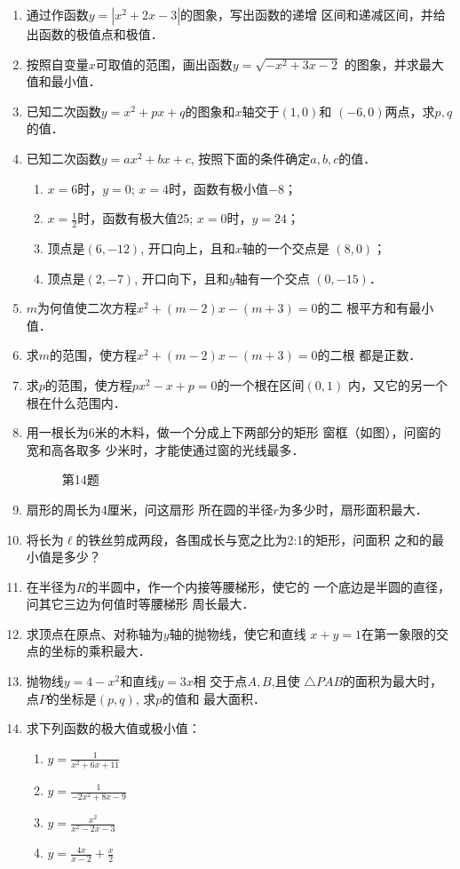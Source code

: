 \begin{enumerate}
\item 通过作函数$y=|x^2+2x-3|$的图象，写出函数的递增
区间和递减区间，并给出函数的极值点和极值．
\item 按照自变量$x$可取值的范围，画出函数$y=\sqrt{-x^2+3x-2}$
的图象，并求最大值和最小值．
\item 已知二次函数$y=x^2+px+q$的图象和$x$轴交于$(1,0)$和
$(-6,0)$两点，求$p,q$的值．
\item 已知二次函数$y=ax^2+bx+c$, 按照下面的条件确定$a,
b,c$的值．
\begin{enumerate}
\item $x=6$时，$y=0$; $x=4$时，函数有极小值$-8$；
\item $x=\frac{1}{2}$时，函数有极大值25; $x=0$时，$y=24$；
\item 顶点是$(6,-12)$, 开口向上，且和$x$轴的一个交点是
$(8,0)$；
\item 顶点是$(2,-7)$, 开口向下，且和$y$轴有一个交点
$(0,-15)$．
\end{enumerate}

\item  $m$为何值使二次方程$x^2+(m-2)x-(m+3)=0$的二
根平方和有最小值．
\item 求$m$的范围，使方程$x^2+(m-2)x-(m+3)=0$的二根
都是正数．
\item  求$p$的范围，使方程$px^2-x+p=0$的一个根在区间$(0,1)$
内，又它的另一个根在什么范围内．
\item 用一根长为6米的木料，做一个分成上下两部分的矩形
窗框（如图），问窗的宽和高各取多
少米时，才能使通过窗的光线最多．
\begin{figure}[htp]
    \centering
    \caption{第14题}
\end{figure}

\item 扇形的周长为4厘米，问这扇形
所在圆的半径$r$为多少时，扇形面积最大．
\item 将长为$\ell$的铁丝剪成两段，各围成长与宽之比为2:1的矩形，问面积
之和的最小值是多少？
\item 在半径为$R$的半圆中，作一个内接等腰梯形，使它的
一个底边是半圆的直径，问其它三边为何值时等腰梯形
周长最大．
\item 求顶点在原点、对称轴为$y$轴的抛物线，使它和直线
$x+y=1$在第一象限的交点的坐标的乘积最大．
\item 抛物线$y=4-x^2$和直线$y=3x$相 交于点$A,B$,且使
$\triangle PAB$的面积为最大时，点$P$的坐标是$(p,q)$, 求$p$的值和
最大面积．
\item 求下列函数的极大值或极小值：
\begin{multicols}{2}
\begin{enumerate}
    \item $y=\frac{1}{x^2+6x+11}$
    \item $y=\frac{1}{-2x^2+8x-9}$
    \item $y=\frac{x^2}{x^2-2x-3}$
    \item $y=\frac{4x}{x-2}+\frac{x}{2}$
\end{enumerate}
\end{multicols}


\end{enumerate}
